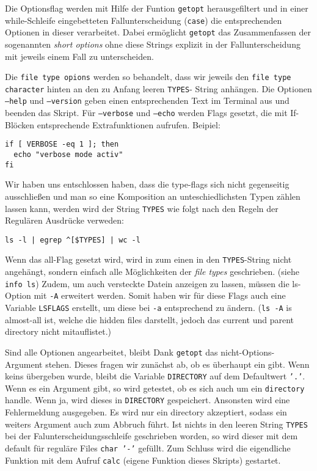 \documentclass[
   draft=false
  ,paper=a4
  ,twoside=false
  ,fontsize=11pt
  ,headsepline
  ,BCOR10mm
  ,DIV11
  ,parskip=full+
]{scrartcl} %
\begin{document}
Die Optionsflag werden mit Hilfe der Funtion \texttt{getopt} herausgefiltert
und in einer while-Schleife eingebetteten Fallunterscheidung (\texttt{case})
die entsprechenden Optionen in dieser verarbeitet. Dabei ermöglicht
\texttt{getopt} das Zusammenfassen der sogenannten \emph{short options} ohne
diese Strings explizit in der Fallunterscheidung mit jeweils einem Fall zu
unterscheiden.

Die \texttt{file type opions} werden so behandelt, dass wir jeweils den
\texttt{file type character} hinten an den zu Anfang leeren \texttt{TYPES}-
String anhängen. Die Optionen \texttt{--help} und \texttt{--version} geben
einen entsprechenden Text im Terminal aus und beenden das Skript. Für
\texttt{--verbose} und \texttt{--echo} werden Flags gesetzt, die mit If-Blöcken
entsprechende Extrafunktionen aufrufen. Beipiel:
\begin{verbatim}
if [ VERBOSE -eq 1 ]; then
  echo "verbose mode activ"
fi
\end{verbatim}

Wir haben uns entschlossen haben, dass die type-flags sich nicht gegenseitig
ausschließen und man so eine Komposition an unteschiedlichsten Typen zählen
lassen kann, werden wird der String \texttt{TYPES} wie folgt nach den Regeln
der Regulären Ausdrücke verweden:
\begin{verbatim}
ls -l | egrep ^[$TYPES] | wc -l
\end{verbatim}

Wenn das all-Flag gesetzt wird, wird in zum einen in den \texttt{TYPES}-String
nicht angehängt, sondern einfach alle Möglichkeiten der \emph{file types}
geschrieben. (siehe \texttt{info ls}) Zudem, um auch versteckte Datein anzeigen
zu lassen, müssen die ls-Option mit \texttt{-A} erweitert werden. Somit haben
wir für diese Flags auch eine Variable \texttt{LSFLAGS} erstellt, um diese
bei \texttt{-a} entsprechend zu ändern. (\texttt{ls -A} is almost-all ist,
welche die hidden files darstellt, jedoch das current und parent directory
nicht mitauflistet.)

Sind alle Optionen angearbeitet, bleibt Dank \texttt{getopt} das nicht-Options-
Argument stehen. Dieses fragen wir zunächst ab, ob es überhaupt ein gibt. Wenn
keins übergeben wurde, bleibt die Variable \texttt{DIRECTORY} auf dem
Defaultwert \texttt{'.'}. Wenn es ein Argument gibt, so wird getestet, ob es
sich auch um ein \texttt{directory} handle. Wenn ja, wird dieses in
\texttt{DIRECTORY} gespeichert. Ansonsten wird eine Fehlermeldung ausgegeben.
Es wird nur ein directory akzeptiert, sodass ein weiters Argument auch zum
Abbruch führt. Ist nichts in den leeren String \texttt{TYPES} bei der
Falunterscheidungsschleife geschrieben worden, so wird dieser mit dem default
für reguläre Files \texttt{char '-'} gefüllt. Zum Schluss wird die eigendliche
Funktion mit dem Aufruf \texttt{calc} (eigene Funktion dieses Skripts)
gestartet.
\end{document}
